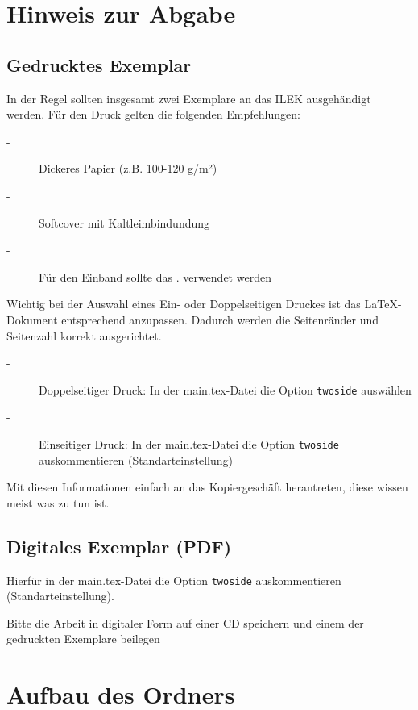 \section*{Hinweis zur Abgabe}

\subsection*{Gedrucktes Exemplar}

In der Regel sollten insgesamt zwei Exemplare an das ILEK ausgehändigt werden. Für den Druck gelten die folgenden Empfehlungen:

\begin{description}
	\item[-] Dickeres Papier (z.B. 100-120 g/m²)
	\item[-] Softcover mit Kaltleimbindundung
	\item[-] Für den Einband sollte das . verwendet werden 
\end{description}

Wichtig bei der Auswahl eines Ein- oder Doppelseitigen Druckes ist das LaTeX-Dokument entsprechend anzupassen. Dadurch werden die Seitenränder und Seitenzahl korrekt ausgerichtet.

\begin{description}
	\item[-] Doppelseitiger Druck: In der main.tex-Datei die Option \lstinline[basicstyle=\ttfamily]|twoside| auswählen
	\item[-] Einseitiger Druck: In der main.tex-Datei die Option \lstinline[basicstyle=\ttfamily]|twoside| auskommentieren (Standarteinstellung)
\end{description}

Mit diesen Informationen einfach an das Kopiergeschäft herantreten, diese wissen meist was zu tun ist.

\subsection*{Digitales Exemplar (PDF)}

Hierfür in der main.tex-Datei die Option \lstinline[basicstyle=\ttfamily]|twoside| auskommentieren (Standarteinstellung).

Bitte die Arbeit in digitaler Form auf einer CD speichern und einem der gedruckten Exemplare beilegen

\newpage

\section*{Aufbau des Ordners}

